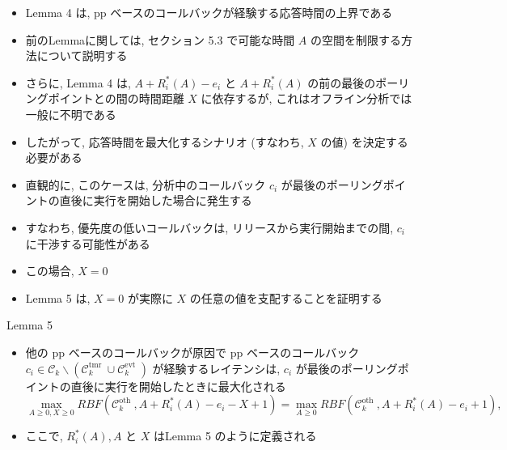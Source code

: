 \begin{frame}{}
    \begin{itemize}
        \item Lemma 4 は, pp ベースのコールバックが経験する応答時間の上界である
        \item 前のLemmaに関しては, セクション 5.3 で可能な時間 $A$ の空間を制限する方法について説明する
        \item さらに, Lemma 4 は, $A+R_{i}^{*}(A)-e_{i}$ と $A+R_{i}^{*}(A)$ の前の最後のポーリングポイントとの間の時間距離 $X$ に依存するが, これはオフライン分析では一般に不明である
        \item したがって, 応答時間を最大化するシナリオ (すなわち,  $X$ の値) を決定する必要がある
        \item 直観的に, このケースは, 分析中のコールバック $c_{i}$ が最後のポーリングポイントの直後に実行を開始した場合に発生する
        \item すなわち, 優先度の低いコールバックは, リリースから実行開始までの間, $c_{i}$ に干渉する可能性がある
        \item この場合, $X=0$
        \item Lemma 5 は, $X=0$ が実際に $X$ の任意の値を支配することを証明する
    \end{itemize}
\end{frame}

\begin{frame}[label=lemma5]{Lemma 5}
    \begin{lemma}[]
        \begin{itemize}
            \item 他の pp ベースのコールバックが原因で pp ベースのコールバック $c_{i} \in \mathcal{C}_{k} \backslash\left(\mathcal{C}_{k}^{\text {tmr }} \cup \mathcal{C}_{k}^{\text {evt }}\right)$ が経験するレイテンシは, $c_{i}$ が最後のポーリングポイントの直後に実行を開始したときに最大化される
                  \begin{equation*}
                      \max _{A \geq 0, X \geq 0} R B F\left(\mathcal{C}_{k}^{\text {oth }}, A+R_{i}^{*}(A)-e_{i}-X+1\right)=\max _{A \geq 0} R B F\left(\mathcal{C}_{k}^{\text {oth }}, A+R_{i}^{*}(A)-e_{i}+1\right),
                  \end{equation*}

            \item ここで, $R_{i}^{*}(A), A$ と $X$ はLemma 5 のように定義される
        \end{itemize}
    \end{lemma}
\end{frame}

